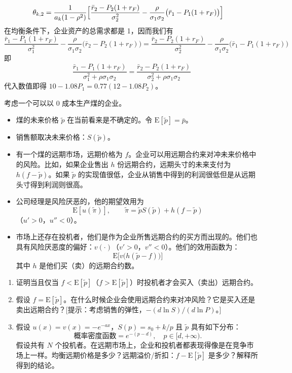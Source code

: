 \begin{solution}
\[\begin{aligned}
        \theta_{k,2}&=\frac{1}{a_{k}(1-\rho^{2})}\Bigl[\frac{\bar{r}_{2}-P_{2}(1+r_{F})}{\sigma_{2}^{2}}-\frac{\rho}{\sigma_{1}\sigma_{2}}\bigl(\bar{r}_{1}-P_{1}(1+r_{F})\bigr)\Bigr]
    \end{aligned}
\]
在均衡条件下，企业资产的总需求都是 1，因而我们有
\[
    \frac{\bar{r}_{1}-P_{1}(1+r_{F})}{\sigma_{1}^{2}}-\frac{\rho}{\sigma_{1}\sigma_{2}}\bigl(\bar{r}_{2}-P_{2}(1+r_{F})\bigr)
    =\frac{\bar{r}_{2}-P_{2}(1+r_{F})}{\sigma_{2}^{2}}-\frac{\rho}{\sigma_{1}\sigma_{2}}\bigl(\bar{r}_{1}-P_{1}(1+r_{F})\bigr)
\]
即
\[
    \frac{\bar{r}_{1}-P_{1}(1+r_{F})}{\sigma_{1}^{2}+\rho\sigma_{1}\sigma_{2}}=\frac{\bar{r}_{2}-P_{2}(1+r_{F})}{\sigma_{2}^{2}+\rho\sigma_{1}\sigma_{2}}
\]
代入数值即得 $10-1.08P_{1}=0.77(12-1.08P_{2})$。
\end{solution}

\begin{problem}
 考虑一个可以以 0 成本生产煤的企业。
\begin{itemize}
    \item 煤的未来价格 $\tilde{p}$ 在当前看来是不确定的。令 $\mathrm{E}[\tilde{p}]=\bar{p}$。
    \item 销售额取决未来价格：$S(\tilde{p})$。
    \item 有一个煤的远期市场，远期价格为 $f$。企业可以用远期合约来对冲未来价格中的风险。比如，如果企业售出 $h$ 份远期合约，远期头寸的未来支付为 $h(f-\tilde{p})$。如果 $\tilde{p}$ 的实现值很低，企业从销售中得到的利润很低但是从远期头寸得到利润则很高。
    \item 公司经理是风险厌恶的，他的期望效用为
    \[
        \mathrm{E}[u(\tilde{\pi})],\qquad \tilde{\pi}=\tilde{p}S(\tilde{p})+h(f-\tilde{p})
    \]
    （$u'>0$，$u''<0$）。
    \item 市场上还存在投机者，他们是作为企业所售远期合约的买方而出现的。他们也具有风险厌恶度的偏好：$v(\cdot)$（$v'>0$，$v''<0$）。他们的效用函数为：
    \[
        \mathrm{E}\bigl[v\bigl(h(\tilde{p}-f)\bigr)\bigr]
    \]
    其中 $h$ 是他们买（卖）的远期合约数。
\end{itemize}
\begin{enumerate}[label=(\alph*)]
    \item 证明当且仅当 $f<\mathrm{E}[\tilde{p}]$（$f>\mathrm{E}[\tilde{p}]$）时投机者才会买入（卖出）远期合约。
    \item 假设 $f=\mathrm{E}[\tilde{p}]$。在什么时候企业会使用远期合约来对冲风险？它是买入还是卖出远期合约？[提示：考虑销售的弹性，$-(d\ln S)/(d\ln P)$。]
    \item 假设 $u(x)=v(x)=-e^{-ax}$，$S(p)=s_{0}+k/p$ 且 $\tilde{p}$ 具有如下分布：
    \[
        \text{概率密度函数}=e^{-(p-d)},\quad p\in[d,+\infty).
    \]
    假设共有 $N$ 个投机者。在远期市场上，企业和投机者都表现得像是在竞争市场上一样。均衡远期价格是多少？远期溢价/折扣：$f-\mathrm{E}[\tilde{p}]$ 是多少？解释所得到的结论。
\end{enumerate}
\end{problem}
